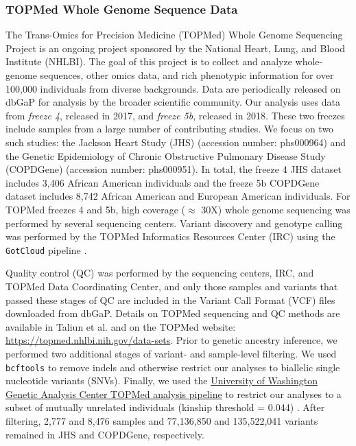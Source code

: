 \documentclass[12pt]{article}
\newcommand{\edit}[1]{{\color{red}{#1}}}
\begin{document}
\subsubsection{TOPMed Whole Genome Sequence Data}

The Trans-Omics for Precision Medicine (TOPMed) Whole Genome Sequencing Project is an ongoing project sponsored by the National Heart, Lung, and Blood Institute (NHLBI).
The goal of this project is to collect and analyze whole-genome sequences, other omics data, and rich phenotypic information for over 100,000 individuals from diverse backgrounds. 
Data are periodically released on dbGaP for analysis by the broader scientific community. 
Our analysis uses data from \textit{freeze 4}, released in 2017, and \textit{freeze 5b}, released in 2018.
These two freezes include samples from a large number of contributing studies.
We focus on two such studies: the Jackson Heart Study (JHS) (accession number: phs000964) and the Genetic Epidemiology of Chronic Obstructive Pulmonary Disease Study (COPDGene) (accession number: phs000951).
In total, the freeze 4 JHS dataset includes 3,406 African American individuals and the freeze 5b COPDGene dataset includes 8,742 African American and European American individuals.
For TOPMed freezes 4 and 5b, high coverage ($\approx$ 30X) whole genome sequencing was performed by several sequencing centers.
Variant discovery and genotype calling was performed by the TOPMed Informatics Resources Center (IRC) using the \texttt{GotCloud} pipeline \citep{jun2015}.

Quality control (QC) was performed by the sequencing centers, IRC, and TOPMed Data Coordinating Center, and only those samples and variants that passed these stages of QC are included in the Variant Call Format (VCF) files downloaded from dbGaP.
Details on TOPMed sequencing and QC methods are available in Taliun et al. \citep{taliun2021} and on the TOPMed website: \href{https://topmed.nhlbi.nih.gov/data-sets}{https://topmed.nhlbi.nih.gov/data-sets}.
Prior to genetic ancestry inference, we performed two additional stages of variant- and sample-level filtering.
We used \texttt{bcftools} \citep{bcftools} to remove indels and otherwise restrict our analyses to biallelic single nucleotide variants (SNVs). 
Finally, we used the \href{https://github.com/UW-GAC/analysis_pipeline}{University of Washington Genetic Analysis Center TOPMed analysis pipeline} to restrict our analyses to a subset of mutually unrelated individuals (kinship threshold = 0.044)\citep{conomos2016related} .
After filtering, 2,777 and 8,476 samples and 77,136,850 and 135,522,041 variants remained in JHS and COPDGene, respectively.
\end{document}
